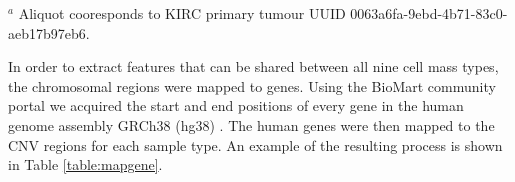 \begin{table}[ht]
\caption{Raw CNV Data from Genome Wide SNP Segmentation} %
\centering %
\raggedright
\footnotesize{$^a$ Aliquot cooresponds to KIRC primary tumour UUID 0063a6fa-9ebd-4b71-83c0-aeb17b97eb6.}

\label{table:rawcnv}
\end{table}


\noindent
In order to extract features that can be shared between all nine cell mass types, the chromosomal regions were mapped to genes. Using the BioMart community portal we acquired the start and end positions of every gene in the human genome assembly GRCh38 (hg38) \cite{smedley2015biomart}. The human genes were then mapped to the CNV regions for each sample type. An example of the resulting process is shown in Table \ref{table:mapgene}.

